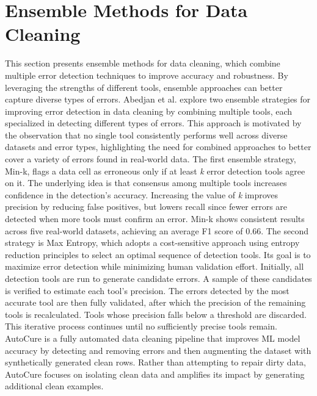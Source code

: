 \section{Ensemble Methods for Data Cleaning}
This section presents ensemble methods for data cleaning, which combine multiple error detection techniques to improve accuracy and robustness. 
By leveraging the strengths of different tools, ensemble approaches can better capture diverse types of errors.
\newline\newline
Abedjan et al. \cite{DDE} explore two ensemble strategies for improving error detection in data cleaning by combining multiple tools, each specialized in detecting different types of errors. 
This approach is motivated by the observation that no single tool consistently performs well across diverse datasets and error types, highlighting the need for combined approaches to better cover a variety of errors found in real-world data.
The first ensemble strategy, Min-k, flags a data cell as erroneous only if at least \textit{k} error detection tools agree on it. 
The underlying idea is that consensus among multiple tools increases confidence in the detection's accuracy. 
Increasing the value of \textit{k} improves precision by reducing false positives, but lowers recall since fewer errors are detected when more tools must confirm an error. 
Min-k shows consistent results across five real-world datasets, achieving an average F1  score of 0.66.
The second strategy is Max Entropy, which adopts a cost-sensitive approach using entropy reduction principles to select an optimal sequence of detection tools. 
Its goal is to maximize error detection while minimizing human validation effort. 
Initially, all detection tools are run to generate candidate errors. 
A sample of these candidates is verified to estimate each tool's precision. 
The errors detected by the most accurate tool are then fully validated, after which the precision of the remaining tools is recalculated. 
Tools whose precision falls below a threshold are discarded. 
This iterative process continues until no sufficiently precise tools remain.
\newline\newline
AutoCure \cite{AUTOCURE} is a fully automated data cleaning pipeline that improves ML model accuracy by detecting and removing errors and then augmenting the dataset with synthetically generated clean rows. 
Rather than attempting to repair dirty data, AutoCure focuses on isolating clean data and amplifies its impact by generating additional clean examples.
